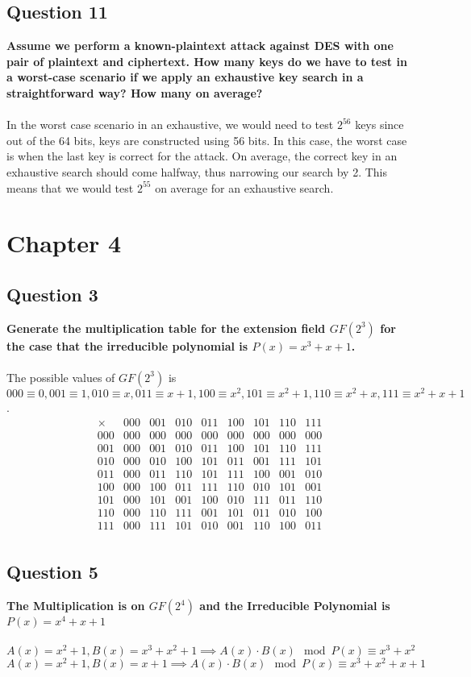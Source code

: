 \documentclass[titlepage]{article}
\begin{document}
{\subsection{Question 11}
{
\textbf{Assume we perform a known-plaintext attack against DES with one pair of plaintext and ciphertext. How many keys do we have to test in a worst-case scenario if we apply an exhaustive key search in a straightforward way? How many on average?}\\\\
In the worst case scenario in an exhaustive, we would need to test \(2^{56}\) keys since out of the 64 bits, keys are constructed using 56 bits. In this case, the worst case is when the last key is correct for the attack. On average, the correct key in an exhaustive search should come halfway, thus narrowing our search by 2. This means that we would test \(2^{55}\) on average for an exhaustive search.
}
}
\clearpage
\section{Chapter 4}
{
\subsection{Question 3}
{
\textbf{Generate the multiplication table for the extension field \(GF(2^3)\) for the case that the irreducible polynomial is \(P(x) = x^3 + x + 1\).}\\\\
The possible values of \(GF(2^3)\) is \(000 \equiv 0, 001 \equiv 1, 010 \equiv x, 011 \equiv x + 1, 100 \equiv x^2, 101 \equiv x^2 + 1, 110 \equiv x^2 + x, 111 \equiv x^2 + x + 1\).
\[
\begin{array}{c|cccccccc}
\times & 000 & 001 & 010 & 011 & 100 & 101 & 110 & 111 \\
\hline
000 & 000 & 000 & 000 & 000 & 000 & 000 & 000 & 000\\
001 & 000 & 001 & 010 & 011 & 100 & 101 & 110 & 111 \\
010 & 000 & 010 & 100 & 101 & 011 & 001 & 111 & 101\\
011 & 000 & 011 & 110 & 101 & 111 & 100 & 001 & 010\\
100 & 000 & 100 & 011 & 111 & 110 & 010 & 101 & 001\\
101 & 000 & 101 & 001 & 100 & 010 & 111 & 011 & 110\\
110 & 000 & 110 & 111 & 001 & 101 & 011 & 010 & 100\\
111 & 000 & 111 & 101 & 010 & 001 & 110 & 100 & 011\\
\end{array}
\]
}
\subsection{Question 5}
{
\textbf{The Multiplication is on \(GF(2^4)\) and the Irreducible Polynomial is \(P(x) = x^4 + x + 1\)}\\\\
\(A(x) = x^2 + 1, B(x) = x^3 + x^2 + 1 \implies A(x)\cdot B(x) \mod P(x) \equiv x^3 + x^2\)\\
\(A(x) = x^2 + 1, B(x) = x + 1 \implies A(x)\cdot B(x) \mod P(x) \equiv x^3 + x^2 + x + 1\)
}
}
\clearpage
\setcounter{section}{5}
\end{document}
